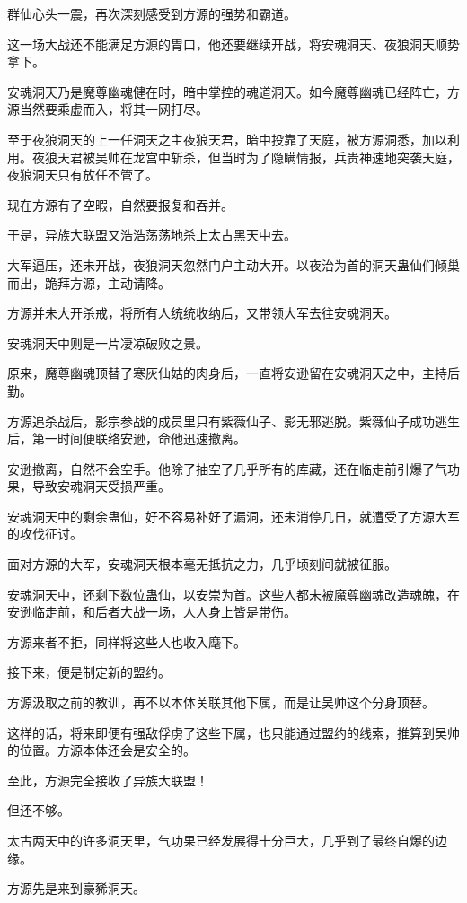 \begin{this_body}
群仙心头一震，再次深刻感受到方源的强势和霸道。

这一场大战还不能满足方源的胃口，他还要继续开战，将安魂洞天、夜狼洞天顺势拿下。

安魂洞天乃是魔尊幽魂健在时，暗中掌控的魂道洞天。如今魔尊幽魂已经阵亡，方源当然要乘虚而入，将其一网打尽。

至于夜狼洞天的上一任洞天之主夜狼天君，暗中投靠了天庭，被方源洞悉，加以利用。夜狼天君被吴帅在龙宫中斩杀，但当时为了隐瞒情报，兵贵神速地突袭天庭，夜狼洞天只有放任不管了。

现在方源有了空暇，自然要报复和吞并。

于是，异族大联盟又浩浩荡荡地杀上太古黑天中去。

大军逼压，还未开战，夜狼洞天忽然门户主动大开。以夜治为首的洞天蛊仙们倾巢而出，跪拜方源，主动请降。

方源并未大开杀戒，将所有人统统收纳后，又带领大军去往安魂洞天。

安魂洞天中则是一片凄凉破败之景。

原来，魔尊幽魂顶替了寒灰仙姑的肉身后，一直将安逊留在安魂洞天之中，主持后勤。

方源追杀战后，影宗参战的成员里只有紫薇仙子、影无邪逃脱。紫薇仙子成功逃生后，第一时间便联络安逊，命他迅速撤离。

安逊撤离，自然不会空手。他除了抽空了几乎所有的库藏，还在临走前引爆了气功果，导致安魂洞天受损严重。

安魂洞天中的剩余蛊仙，好不容易补好了漏洞，还未消停几日，就遭受了方源大军的攻伐征讨。

面对方源的大军，安魂洞天根本毫无抵抗之力，几乎顷刻间就被征服。

安魂洞天中，还剩下数位蛊仙，以安崇为首。这些人都未被魔尊幽魂改造魂魄，在安逊临走前，和后者大战一场，人人身上皆是带伤。

方源来者不拒，同样将这些人也收入麾下。

接下来，便是制定新的盟约。

方源汲取之前的教训，再不以本体关联其他下属，而是让吴帅这个分身顶替。

这样的话，将来即便有强敌俘虏了这些下属，也只能通过盟约的线索，推算到吴帅的位置。方源本体还会是安全的。

至此，方源完全接收了异族大联盟！

但还不够。

太古两天中的许多洞天里，气功果已经发展得十分巨大，几乎到了最终自爆的边缘。

方源先是来到豪豨洞天。


\end{this_body}
